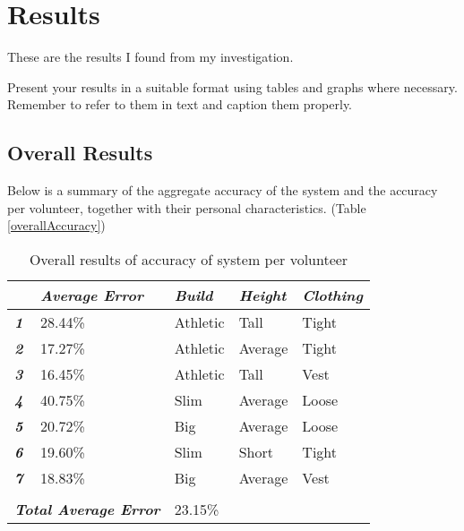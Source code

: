\chapter{Results}
These are the results I found from my investigation.

Present your results in a suitable format using tables and graphs where necessary. Remember to refer
to them in text and caption them properly.


\section{Overall Results}
 Below is a summary of the aggregate accuracy of the system and the accuracy per volunteer, together with their personal characteristics. (Table \ref{overallAccuracy})
 
 \begin{table}[htbp]
 	\centering
 	\caption{Overall results of accuracy of system per volunteer}
 	\begin{tabularx}{\textwidth}{|XX|XXX|}
 		\centering
 		\toprule
 		\multicolumn{1}{|X|}{\textit{\textbf{Volunteer Number}}} & \textit{\textbf{Average Error}} & \multicolumn{1}{X|}{\textit{\textbf{Build}}} & \multicolumn{1}{X|}{\textit{\textbf{Height}}} & \textit{\textbf{Clothing}} \\
 		\midrule
 		\multicolumn{1}{|X|}{\textit{\textbf{1}}} & 28.44\% & \multicolumn{1}{X|}{Athletic} & \multicolumn{1}{X|}{Tall} & Tight \\
 		\midrule
 		\multicolumn{1}{|X|}{\textit{\textbf{2}}} & 17.27\% & \multicolumn{1}{X|}{Athletic} & \multicolumn{1}{X|}{Average} & Tight \\
 		\midrule
 		\multicolumn{1}{|X|}{\textit{\textbf{3}}} & 16.45\% & \multicolumn{1}{X|}{Athletic} & \multicolumn{1}{X|}{Tall} & Vest \\
 		\midrule
 		\multicolumn{1}{|X|}{\textit{\textbf{4}}} & 40.75\% & \multicolumn{1}{X|}{Slim} & \multicolumn{1}{X|}{Average} & Loose \\
 		\midrule
 		\multicolumn{1}{|X|}{\textit{\textbf{5}}} & 20.72\% & \multicolumn{1}{X|}{Big} & \multicolumn{1}{X|}{Average} & Loose \\
 		\midrule
 		\multicolumn{1}{|X|}{\textit{\textbf{6}}} & 19.60\% & \multicolumn{1}{X|}{Slim} & \multicolumn{1}{X|}{Short} & Tight \\
 		\midrule
 		\multicolumn{1}{|X|}{\textit{\textbf{7}}} & 18.83\% & \multicolumn{1}{X|}{Big} & \multicolumn{1}{X|}{Average} & Vest \\
 		\midrule
 		\multicolumn{5}{|X|}{} \\
 		\midrule
 		\multicolumn{2}{|X|}{\textit{\textbf{Total Average Error}}} & \multicolumn{3}{X|}{23.15\%} \\
 		\bottomrule
 	\end{tabularx}%
 	\label{tab:overallAccuracy}%
 \end{table}%
 

